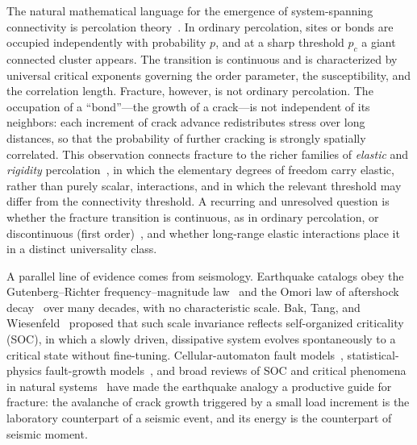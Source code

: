 \documentclass[preprint,12pt]{elsarticle}
\begin{document}
The natural mathematical language for the emergence of system-spanning connectivity
is percolation theory~\cite{StaufferAharony1994,Stauffer1979,Sahimi1994}. In ordinary
percolation, sites or bonds are occupied independently with probability $p$, and at a
sharp threshold $p_c$ a giant connected cluster appears. The transition is continuous
and is characterized by universal critical exponents governing the order parameter,
the susceptibility, and the correlation length. Fracture, however, is not ordinary
percolation. The occupation of a ``bond''---the growth of a crack---is not
independent of its neighbors: each increment of crack advance redistributes stress
over long distances, so that the probability of further cracking is strongly
spatially correlated. This observation connects fracture to the richer families of
\emph{elastic} and \emph{rigidity} percolation~\cite{FengSen1984,KantorWebman1984,JacobsThorpe1995},
in which the elementary degrees of freedom carry elastic, rather than purely scalar,
interactions, and in which the relevant threshold may differ from the connectivity
threshold. A recurring and unresolved question is whether the fracture transition is
continuous, as in ordinary percolation, or discontinuous (first
order)~\cite{ZapperiRayStanleyVespignani1997}, and whether long-range elastic
interactions place it in a distinct universality class.

A parallel line of evidence comes from seismology. Earthquake catalogs obey the
Gutenberg--Richter frequency--magnitude law~\cite{GutenbergRichter1944} and the Omori
law of aftershock decay~\cite{Omori1894,Utsu1961} over many decades, with no
characteristic scale. Bak, Tang, and Wiesenfeld~\cite{BakTangWiesenfeld1987} proposed
that such scale invariance reflects self-organized criticality (SOC), in which a
slowly driven, dissipative system evolves spontaneously to a critical state without
fine-tuning. Cellular-automaton fault models~\cite{BurridgeKnopoff1967,OlamiFederChristensen1992},
statistical-physics fault-growth models~\cite{CowieVannesteSornette1993}, and broad
reviews of SOC and critical phenomena in natural
systems~\cite{Turcotte1999,Sornette2006,Stanley1971,ChristensenMoloney2005} have made
the earthquake analogy a productive guide for fracture: the avalanche of crack growth
triggered by a small load increment is the laboratory counterpart of a seismic event,
and its energy is the counterpart of seismic moment.
\end{document}
